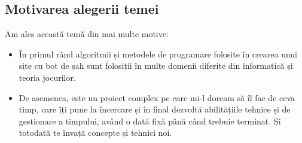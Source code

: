 \newpage
\begin{center}
	\section{Motivarea alegerii temei}
\end{center}
\vspace{2cm}

Am ales această temă din mai multe motive:
\begin{itemize}
	\item În primul rând algoritmii și metodele de programare folosite în crearea unui
	      site cu bot de șah sunt folosiții în multe domenii diferite din informatică
	      și teoria jocurilor.
	\item De asemenea, este un proiect complex pe care mi-l doream să îl fac de ceva timp,
	      care îți pune la încercare și în final dezvoltă abilitățiile tehnice și de
	      gestionare a timpului, având o dată fixă până când trebuie terminat. Și totodată
	      te învață concepte și tehnici noi.
\end{itemize}
